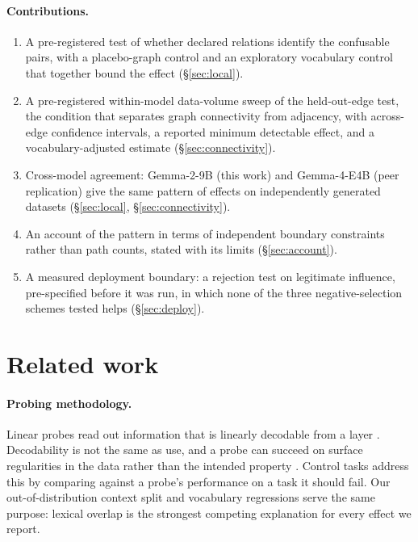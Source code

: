 \documentclass[11pt]{article}
\begin{document}
\paragraph{Contributions.}
\begin{enumerate}
  \item A pre-registered test of whether declared relations identify the confusable pairs, with a placebo-graph
        control and an exploratory vocabulary control that together bound the effect (\S\ref{sec:local}).
  \item A pre-registered within-model data-volume sweep of the held-out-edge test, the condition that separates
        graph connectivity from adjacency, with across-edge confidence intervals, a reported minimum detectable
        effect, and a vocabulary-adjusted estimate (\S\ref{sec:connectivity}).
  \item Cross-model agreement: Gemma-2-9B (this work) and Gemma-4-E4B (peer replication) give the same pattern of
        effects on independently generated datasets (\S\ref{sec:local}, \S\ref{sec:connectivity}).
  \item An account of the pattern in terms of independent boundary constraints rather than path counts, stated
        with its limits (\S\ref{sec:account}).
  \item A measured deployment boundary: a rejection test on legitimate influence, pre-specified before it was
        run, in which none of the three negative-selection schemes tested helps (\S\ref{sec:deploy}).
\end{enumerate}

\section{Related work}
\label{sec:related}

\paragraph{Probing methodology.} Linear probes read out information that is linearly decodable from a layer
\citep{alain2016probes,kim2018tcav}. Decodability is not the same as use, and a probe can succeed on surface
regularities in the data rather than the intended property \citep{belinkov2022probing}. Control tasks
\citep{hewitt2019control} address this by comparing against a probe's performance on a task it should fail. Our
out-of-distribution context split and vocabulary regressions serve the same purpose: lexical overlap is the
strongest competing explanation for every effect we report.
\end{document}
